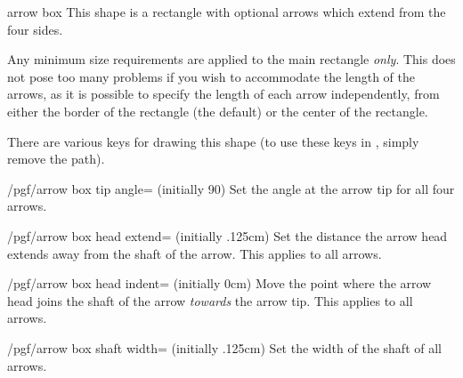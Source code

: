 \begin{shape}{arrow box}
This shape is a rectangle with optional arrows which extend from the
four sides.

\begin{codeexample}[]
\end{codeexample}

Any minimum size requirements are applied to the main rectangle
\emph{only}. This does not pose too many problems if you wish to
accommodate the length of the arrows, as it is possible to specify
the length of each arrow independently, from either the border of the
rectangle (the default) or the center of the rectangle.

\begin{codeexample}[]
\end{codeexample}

There are various \pgfname{} keys for drawing this shape (to use these
keys in \tikzname, simply remove the  path).

\begin{key}{/pgf/arrow box tip angle= (initially 90)}
  Set the angle at the arrow tip for all four arrows.
\end{key}

\begin{key}{/pgf/arrow box head extend= (initially .125cm)}
  Set the distance the arrow head extends away from the shaft
  of the arrow. This applies to all arrows.
\end{key}

\begin{key}{/pgf/arrow box head indent= (initially 0cm)}
  Move the point where the arrow head joins the shaft of the arrow
  \emph{towards} the arrow tip. This applies to all arrows.
\end{key}

\begin{key}{/pgf/arrow box shaft width= (initially .125cm)}
  Set the width of the shaft of all arrows.
\end{key}


\end{shape}
